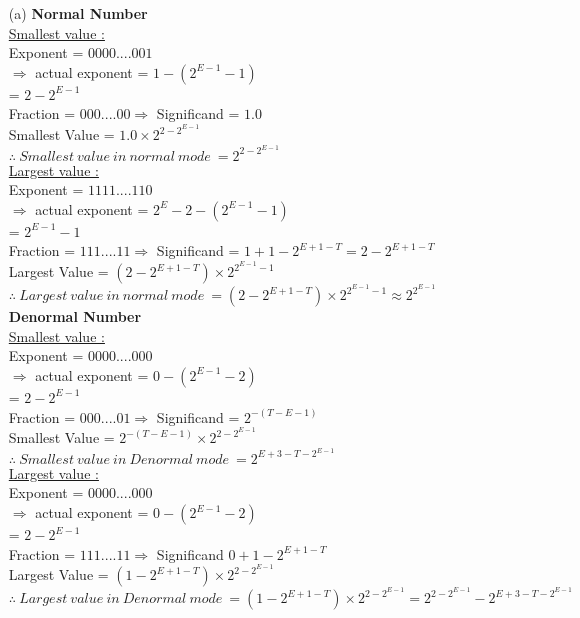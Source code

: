 \documentclass[letterpaper]{article}
\begin{document}
\begin{large}
\begin{flushleft}
\begin{enumerate}
\begin{enumerate}
\item[(a) ]\textbf{Normal Number}\\[0.1in]
\underline{Smallest value : }\\[0.1in]
Exponent = $0000....001$\\[0.1in]
$\Rightarrow$ actual exponent = $1 - (2^{E-1}-1)$\\[0.1in]
\qquad\qquad\qquad\qquad\:\!\! = $2 - 2^{E-1}$\\[0.1in]
Fraction = $000....00$\quad$\Rightarrow$ Significand = $1.0$\\[0.2in]
Smallest Value = $1.0\times 2^{2 - 2^{E-1}}$\\[0.2in]
$\boxed{\therefore\ Smallest\ value\ in\ normal\ mode\ = 2^{2 - 2^{E-1}}}$\\[0.2in]
\underline{Largest value : }\\[0.1in]
Exponent = $1111....110$\\[0.1in]
$\Rightarrow$ actual exponent = $2^E - 2 - (2^{E-1}-1)$\\[0.1in]
\qquad\qquad\qquad\qquad\:\!\! = $2^{E-1} - 1$\\[0.1in]
Fraction = $111....11$\quad$\Rightarrow$ Significand = $1+1-2^{E+1-T} = 2-2^{E+1-T}$\\[0.2in]
Largest Value = $(2-2^{E+1-T})\times 2^{2^{E-1}-1}$\\[0.2in]
$\boxed{\therefore\ Largest\ value\ in\ normal\ mode\ = (2-2^{E+1-T})\times 2^{2^{E-1}-1} \approx 2^{2^{E-1}}}$\\[0.2in]
\textbf{Denormal Number}\\[0.1in]
\underline{Smallest value : }\\[0.1in]
Exponent = $0000....000$\\[0.1in]
$\Rightarrow$ actual exponent = $0 - (2^{E-1}-2)$\\[0.1in]
\qquad\qquad\qquad\qquad\:\!\! = $2 - 2^{E-1}$\\[0.1in]
Fraction = $000....01$\quad$\Rightarrow$ Significand = $2^{-(T-E-1)}$\\[0.2in]
Smallest Value = $2^{-(T-E-1)}\times 2^{2 - 2^{E-1}}$\\[0.2in]
$\boxed{\therefore\ Smallest\ value\ in\ Denormal\ mode\ = 2^{E+3-T-2^{E-1}}}$\\[0.2in]
\clearpage
\underline{Largest value : }\\[0.1in]
Exponent = $0000....000$\\[0.1in]
$\Rightarrow$ actual exponent = $0 - (2^{E-1}-2)$\\[0.1in]
\qquad\qquad\qquad\qquad\:\!\! = $2 - 2^{E-1}$\\[0.1in]
Fraction = $111....11$\quad$\Rightarrow$ Significand $0+1-2^{E+1-T} $\\[0.2in]
Largest Value = $(1-2^{E+1-T})\times 2^{2-2^{E-1}}$\\[0.2in]
$\boxed{\therefore\ Largest\ value\ in\ Denormal\ mode\ = (1-2^{E+1-T})\times 2^{2-2^{E-1}}= 2^{2-2^{E-1}}-2^{E+3-T-2^{E-1}}}$\\[0.2in]


\end{enumerate}
\end{enumerate}
\end{flushleft}
\end{large}
\end{document}
